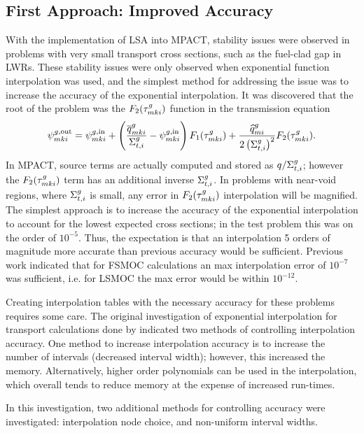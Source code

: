 {{    \subsection{First Approach: Improved Accuracy}{\label{ssec:LSMOC:ET:First Approach: Improved Accuracy}
      With the implementation of \ac{LSA} into MPACT, stability issues were observed in problems with very small transport cross sections, such as the fuel-clad gap in \acp{LWR}.
      These stability issues were only observed when exponential function interpolation was used, and the simplest method for addressing the issue was to increase the accuracy of the exponential interpolation.
      It was discovered that the root of the problem was the $F_2(\segopt)$ function in the transmission equation
      \begin{equation}\label{eq:LSMOC:ET:Transmission Original}
        \afluxout = \afluxin
                  + \left(\frac{\tsrcF}{\xst}-\afluxin\right)F_1(\segopt)
                  + \frac{\tsrcL}{2\left(\xst\right)^2}F_2(\segopt).
      \end{equation}
      In MPACT, source terms are actually computed and stored as $q/\xst$; however the $F_2(\segopt)$ term has an additional inverse $\xst$.
      In problems with near-void regions, where $\xst$ is small, any error in $F_2(\segopt)$ interpolation will be magnified.
      The simplest approach is to increase the accuracy of the exponential interpolation to account for the lowest expected cross sections; in the test problem this was on the order of $10^{-5}$.
      Thus, the expectation is that an interpolation 5 orders of magnitude more accurate than previous accuracy would be sufficient.
      Previous work \cite{Yamamoto2004} indicated that for \ac{FSMOC} calculations an max interpolation error of $10^{-7}$ was sufficient, i.e. for \ac{LSMOC} the max error would be within $10^{-12}$.

      Creating interpolation tables with the necessary accuracy for these problems requires some care.
      The original investigation of exponential interpolation for transport calculations  done by \citet{Yamamoto2004} indicated two methods of controlling interpolation accuracy.
      One method to increase interpolation accuracy is to increase the number of intervals (decreased interval width); however, this increased the memory.
      Alternatively, higher order polynomials can be used in the interpolation, which overall tends to reduce memory at the expense of increased run-times.

      In this investigation, two additional methods for controlling accuracy were investigated: interpolation node choice, and non-uniform interval widths.
}}}
